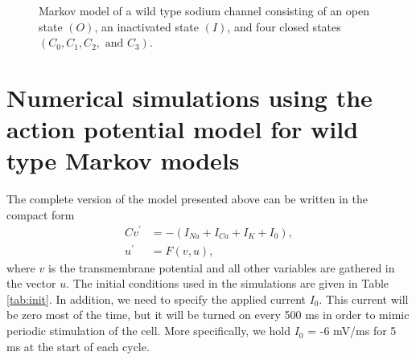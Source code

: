 \begin{figure}[ptb]
\begin{center}
\end{center}
\caption{Markov model of a wild type sodium channel consisting of an open
state $(O)$, an inactivated state $(I)$, and four closed states $(C_{0}
,C_{1},C_{2}, \text{ and }C_{3})$. }
\label{wtreac3331}
\end{figure}


\section[Numerical action potential; wild type]{Numerical simulations using the action potential model for wild type Markov models}

The complete version of the model presented above can be written in the compact form
\begin{align}
Cv^{\prime}  & =-\left(  I_{Na}+I_{Ca}+I_{K}+I_{0}\right),  \label{s401}\\
u^{\prime}  & =F(v,u)\label{s402},
\end{align}
where $v$ is the transmembrane potential and all other variables are gathered in the vector $u$. The initial conditions used in the simulations are given in Table \ref{tab:init}. In addition, we need to specify the applied current $I_0$. This current will be zero most of the time, but it will be turned on every 500 ms in order to mimic periodic stimulation of the cell. More specifically,
we hold $I_0$ = -6 mV/ms for 5 ms at the start of each cycle.

